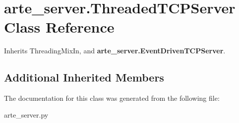 \section{arte\+\_\+server.\+Threaded\+T\+C\+P\+Server Class Reference}
\label{classarte__server_1_1_threaded_t_c_p_server}


Inherits Threading\+Mix\+In, and {\bf arte\+\_\+server.\+Event\+Driven\+T\+C\+P\+Server}.

\subsection*{Additional Inherited Members}


The documentation for this class was generated from the following file\+:\begin{DoxyCompactItemize}
\item 
arte\+\_\+server.\+py\end{DoxyCompactItemize}
